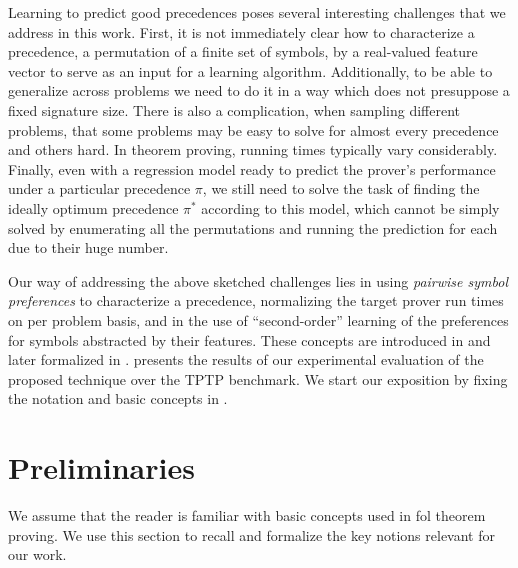 Learning to predict good precedences poses several interesting challenges that we address in this work.
First, it is not immediately clear how to characterize a precedence, a permutation of a finite set of symbols,
by a real-valued feature vector to serve as an input for a learning algorithm. 
Additionally, to be able to generalize across problems
we need to do it in a way which does not presuppose a fixed signature size. 
There is also a complication, when sampling different problems,
that some problems may be easy to solve for almost every precedence and others hard.
In theorem proving, running times typically vary considerably.
Finally, even with a regression model ready to predict the prover's performance 
under a particular precedence $\pi$, we still need to solve the task of finding 
the ideally optimum precedence $\pi^*$ according to this model,
which cannot be simply solved by enumerating all the permutations and running the prediction for each
due to their huge number.

Our way of addressing the above sketched challenges lies in using \emph{pairwise symbol preferences}
to characterize a precedence, normalizing the target prover run times on per problem basis,
and in the use of ``second-order'' learning of the preferences for symbols abstracted by their features.
These concepts are introduced in  and later formalized in .
 presents the results of our experimental evaluation of the proposed technique over the TPTP \cite{Sut17} benchmark.
We start our exposition by fixing the notation and basic concepts in .


\section{Preliminaries} \label{sect:prelim}


We assume that the reader is familiar with basic concepts used in \gls*{fol} theorem proving.
We use this section to recall and formalize the key notions relevant for our work.

